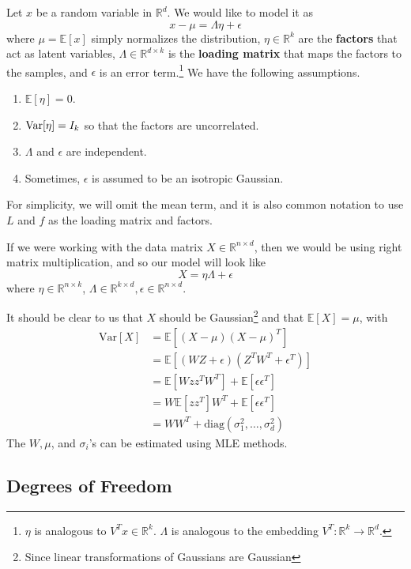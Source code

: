   \begin{definition} 
    Let $x$ be a random variable in $\mathbb{R}^d$. We would like to model it as 
    \begin{equation}
      x - \mu = \Lambda \eta + \epsilon
    \end{equation}
    where $\mu = \mathbb{E}[x]$ simply normalizes the distribution, $\eta \in \mathbb{R}^k$ are the \textbf{factors} that act as latent variables, $\Lambda \in \mathbb{R}^{d \times k}$ is the \textbf{loading matrix} that maps the factors to the samples, and $\epsilon$ is an error term.\footnote{$\eta$ is analogous to $V^T x \in \mathbb{R}^k$. $\Lambda$ is analogous to the embedding $V^T: \mathbb{R}^k \to \mathbb{R}^d$.} We have the following assumptions. 
    \begin{enumerate}
      \item $\mathbb{E}[\eta] = 0$. 
      \item $\operatorname{Var}[\eta] = I_k$ so that the factors are uncorrelated. 
      \item $\Lambda$ and $\epsilon$ are independent. 
      \item Sometimes, $\epsilon$ is assumed to be an isotropic Gaussian. 
    \end{enumerate}
  \end{definition} 

  For simplicity, we will omit the mean term, and it is also common notation to use $L$ and $f$ as the loading matrix and factors. 

  If we were working with the data matrix $X \in \mathbb{R}^{n \times d}$, then we would be using right matrix multiplication, and so our model will look like 
  \begin{equation}
    X = \eta \Lambda + \epsilon
  \end{equation}
  where $\eta \in \mathbb{R}^{n \times k}$, $\Lambda \in \mathbb{R}^{k \times d}, \epsilon \in \mathbb{R}^{n \times d}$. 

  \begin{theorem}[Likelihood]
    
  \end{theorem}

  \begin{lemma} 
    It should be clear to us that $X$ should be Gaussian\footnote{Since linear transformations of Gaussians are Gaussian} and that $\mathbb{E}[X] = \mu$, with 
    \begin{align} 
        \mathrm{Var}[X] & = \mathbb{E}[ (X - \mu)(X - \mu)^T ] \\
                        & = \mathbb{E}[ (W Z + \epsilon) (Z^T W^T + \epsilon^T)] \\
                        & = \mathbb{E}[W z z^T W^T] + \mathbb{E}[ \epsilon \epsilon^T] \\
                        & = W \mathbb{E}[ z z^T] W^T + \mathbb{E}[ \epsilon \epsilon^T] \\
                        & = W W^T + \mathrm{diag}(\sigma_1^2, \ldots, \sigma_d^2) 
    \end{align} 
    The $W, \mu$, and $\sigma_i$'s can be estimated using MLE methods. 
  \end{lemma}

\subsection{Degrees of Freedom}

  

